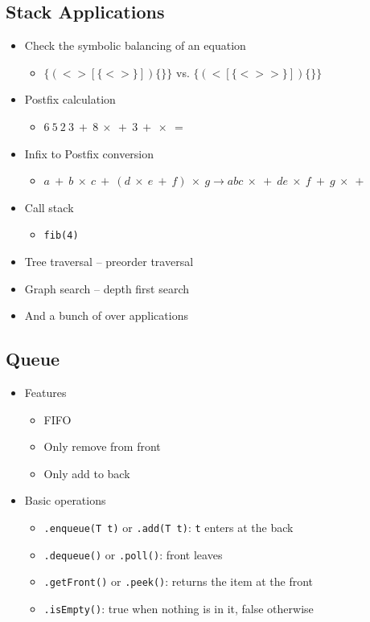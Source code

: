 \documentclass[10pt]{article}
\begin{document}
\subsection*{Stack Applications}
\begin{itemize}
    \item Check the symbolic balancing of an equation
    \begin{itemize}
        \item $\{(<>[\{<>\}])\{\}\}$ vs. $\{(<[\{<>>\}])\{\}\}$
    \end{itemize}
    \item Postfix calculation
    \begin{itemize}
        \item $6\ 5\ 2\ 3\ +\ 8\ \times\ +\ 3\ +\ \times\ = $
    \end{itemize}
    \item Infix to Postfix conversion
    \begin{itemize}
        \item $a\ +\ b\ \times\ c\ +\ (d\ \times\ e\ +\ f)\ \times\ 
        g \to abc\ \times\ +\ de\ \times\ f\ +\ g\ \times\ +$
    \end{itemize}
    \item Call stack
    \begin{itemize}
        \item \texttt{fib(4)}
    \end{itemize}
    \item Tree traversal -- preorder traversal
    \item Graph search -- depth first search
    \item And a bunch of over applications
\end{itemize}

\subsection*{Queue}
\begin{itemize}
    \item Features
    \begin{itemize}
        \item FIFO
        \item Only remove from front
        \item Only add to back
    \end{itemize}
    \item Basic operations
    \begin{itemize}
        \item \texttt{.enqueue(T t)} or \texttt{.add(T t)}: \texttt{t} enters at the back
        \item \texttt{.dequeue()} or \texttt{.poll()}: front leaves
        \item \texttt{.getFront()} or \texttt{.peek()}: returns the item at the front
        \item \texttt{.isEmpty()}: true when nothing is in it, false otherwise
    \end{itemize}
\end{itemize}
\end{document}
